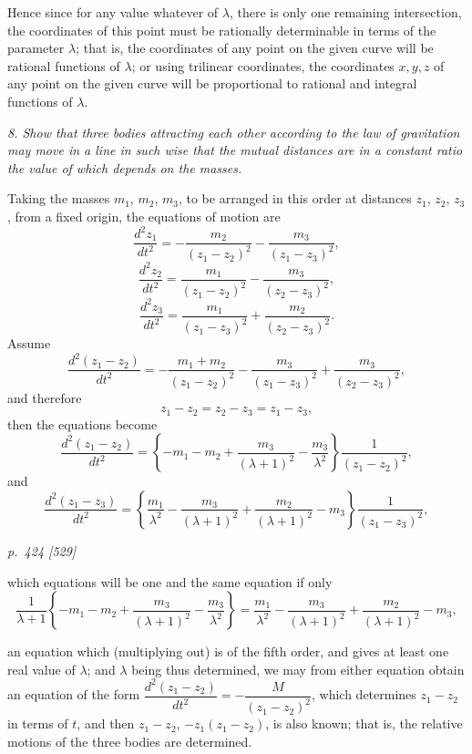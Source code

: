 \documentclass[11pt,a4paper]{article}
\theoremstyle{plain}
\theoremstyle{definition}
\begin{document}
Hence since for any value whatever of $\lambda$, there is only one remaining intersection, the coordinates of this point must be rationally determinable in terms of the parameter $\lambda$; that is, the coordinates of any point on the given curve will be rational functions of $\lambda$; or using trilinear coordinates, the coordinates $x, y, z$ of any point on the given curve will be proportional to rational and integral functions of $\lambda$.

\textit{8. Show that three bodies attracting each other according to the law of gravitation may move in a line in such wise that the mutual distances are in a constant ratio the value of which depends on the masses.}

Taking the masses $m_1$, $m_2$, $m_3$, to be arranged in this order at distances $z_1$, $z_2$, $z_3$,
from a fixed origin, the equations of motion are
\[
\frac{d^2 z_1}{dt^2} = -\frac{m_2}{(z_1 - z_2)^2} - \frac{m_3}{(z_1 - z_3)^2},
\]
\[
\frac{d^2 z_2}{dt^2} = \frac{m_1}{(z_1 - z_2)^2} - \frac{m_3}{(z_2 - z_3)^2},
\]
\[
\frac{d^2 z_3}{dt^2} = \frac{m_1}{(z_1 - z_3)^2} + \frac{m_2}{(z_2 - z_3)^2}.
\]
Assume
\[
\frac{d^2(z_1 - z_2)}{dt^2} = -\frac{m_1 + m_2}{(z_1 - z_2)^2} - \frac{m_3}{(z_1 - z_3)^2} + \frac{m_3}{(z_2 - z_3)^2},
\]
and therefore
\[
z_1 - z_2 = z_2 - z_3 = z_1 - z_3,
\]
then the equations become
\[
\frac{d^2(z_1 - z_2)}{dt^2} = \left\{- m_1 - m_2 + \frac{m_3}{(\lambda + 1)^2} - \frac{m_3}{\lambda^2}\right\}\frac{1}{(z_1 - z_2)^2},
\]
and
\[
\frac{d^2(z_1 - z_3)}{dt^2} = \left\{\frac{m_1}{\lambda^2} - \frac{m_3}{(\lambda + 1)^2} + \frac{m_2}{(\lambda + 1)^2} - m_3\right\}\frac{1}{(z_1 - z_3)^2},
\]

\clearpage

\bigskip
\textit{p.~424 [529]}
\smallskip

which equations will be one and the same equation if only
\[
\frac{1}{\lambda + 1}\left\{- m_1 - m_2 + \frac{m_3}{(\lambda + 1)^2} - \frac{m_3}{\lambda^2}\right\} = \frac{m_1}{\lambda^2} - \frac{m_3}{(\lambda + 1)^2} + \frac{m_2}{(\lambda + 1)^2} - m_3 ,
\]

\noindent
an equation which (multiplying out) is of the fifth order, and gives at least one real
value of $\lambda$; and $\lambda$ being thus determined, we may from either equation obtain an
equation of the form $\dfrac{d^2(z_1 - z_2)}{dt^2} = -\dfrac{M}{(z_1 - z_2)^2}$, which determines $z_1 - z_2$ in terms of $t$, and
then $z_1 - z_2$, $-z_1 (z_1 - z_2)$, is also known; that is, the relative motions of the three bodies
are determined.
\end{document}
